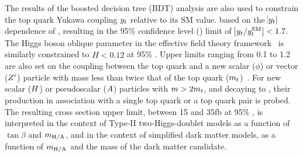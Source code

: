 The results of the boosted decision tree (BDT) analysis are also used to
constrain the top quark Yukawa coupling $y_{t}$ relative to its SM value.
based on the $\abs{y_{t}}$ dependence of \xsectttt, resulting in the 95\% confidence
level (\CL) limit of $\abs{y_{t}/y_{t}^{\mathrm{SM}}} < 1.7$. The Higgs
boson oblique parameter in the effective field theory
framework~\cite{THEORY:ObliqueHiggs2019} is similarly constrained to $\hat{H} <
0.12$ at 95\% \CL. Upper limits ranging from 0.1 to 1.2 are also set on the
coupling between the top quark and a new scalar ($\phi$) or vector ($Z^\prime$)
particle with mass less than twice that of the top quark
($m_t$)~\cite{THEORY:Alvarez2016nrz}. For new scalar ($H$) or
pseudoscalar ($A$) particles with $m > 2m_t$, and decaying to \ttbar,
their production in association with a single top quark or a top quark pair
is probed. The resulting cross section upper limit, between 15 and
35\unit{fb} at 95\% \CL, is interpreted in the context of Type-II
two-Higgs-doublet
models as a
function of $\tan \beta$ and $m_\mathrm{H/A}$, and in the context of
simplified dark matter models, as a
function of $m_\mathrm{H/A}$ and the mass of the dark matter candidate.
